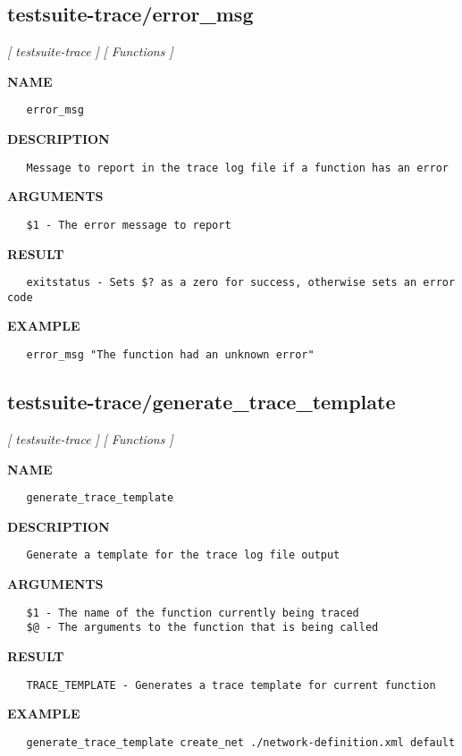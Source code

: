 \subsection{testsuite-trace/error\_msg}
\textsl{[ testsuite-trace ]}
\textsl{[ Functions ]}

\label{ch:robo44}
\label{ch:testsuite_trace_error_msg}
\textbf{NAME}
\begin{verbatim}
   error_msg
\end{verbatim}
\textbf{DESCRIPTION}
\begin{verbatim}
   Message to report in the trace log file if a function has an error
\end{verbatim}
\textbf{ARGUMENTS}
\begin{verbatim}
   $1 - The error message to report
\end{verbatim}
\textbf{RESULT}
\begin{verbatim}
   exitstatus - Sets $? as a zero for success, otherwise sets an error code
\end{verbatim}
\textbf{EXAMPLE}
\begin{verbatim}
   error_msg "The function had an unknown error"
\end{verbatim}
\newpage
\subsection{testsuite-trace/generate\_trace\_template}
\textsl{[ testsuite-trace ]}
\textsl{[ Functions ]}

\label{ch:robo45}
\label{ch:testsuite_trace_generate_trace_template}
\textbf{NAME}
\begin{verbatim}
   generate_trace_template
\end{verbatim}
\textbf{DESCRIPTION}
\begin{verbatim}
   Generate a template for the trace log file output
\end{verbatim}
\textbf{ARGUMENTS}
\begin{verbatim}
   $1 - The name of the function currently being traced
   $@ - The arguments to the function that is being called
\end{verbatim}
\textbf{RESULT}
\begin{verbatim}
   TRACE_TEMPLATE - Generates a trace template for current function
\end{verbatim}
\textbf{EXAMPLE}
\begin{verbatim}
   generate_trace_template create_net ./network-definition.xml default
\end{verbatim}
\newpage
